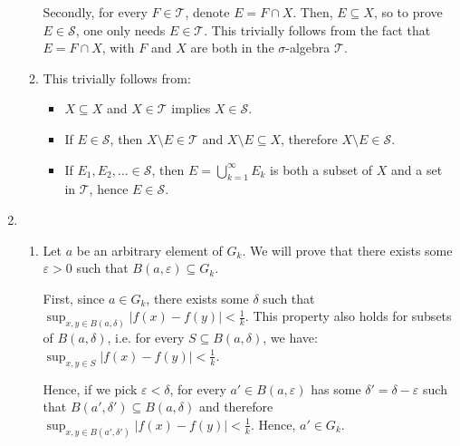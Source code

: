 \begin{enumerate}[label=\textbf{2B.\arabic*}]
\begin{enumerate}[label=(\alph*)]
      Secondly, for every \( F \in \mathcal{T} \), denote \( E = F \cap X \).
      Then, \( E \subseteq X \), so to prove \( E \in \mathcal{S} \), one only
      needs \( E \in \mathcal{T} \). This trivially follows from the fact that
      \( E = F \cap X \), with \( F \) and \( X \) are both in the \( \sigma
      \)-algebra \( \mathcal{T} \).
    \item This trivially follows from:
      \begin{itemize}
        \item \( X \subseteq X \) and \( X \in \mathcal{T} \) implies \( X \in
          \mathcal{S} \).
        \item If \( E \in \mathcal{S} \), then \( X \setminus E \in \mathcal{T}
          \) and \( X \setminus E \subseteq X \), therefore \( X \setminus E \in
          \mathcal{S}\).
        \item If \( E_{1}, E_{2}, \ldots  \in \mathcal{S} \), then \( E =
          \bigcup_{k = 1}^{\infty} E_{k} \) is both a subset of \( X \) and a
          set in \( \mathcal{T} \), hence \( E \in \mathcal{S} \).
    \end{itemize}
  \end{enumerate}
\item 
  \begin{enumerate}[label=(\alph*)]
    \item Let \( a \) be an arbitrary element of \( G_{k} \). We will prove that
      there exists some \( \varepsilon > 0 \) such that \( B(a, \varepsilon)
      \subseteq G_{k} \).

      First, since \( a \in G_{k} \), there exists some \( \delta \) such that
      \( \sup_{x, y \in B(a, \delta)} |f(x)-f(y)| < \frac{1}{k} \). This
      property also holds for subsets of \( B(a, \delta) \), i.e. for every \( S
      \subseteq B(a, \delta)\), we have: \( \sup_{x, y \in S} |f(x)-f(y)| <
      \frac{1}{k} \).

      Hence, if we pick \( \varepsilon < \delta \), for every \( a' \in B(a,
      \varepsilon) \) has some \( \delta' = \delta - \varepsilon \) such that \(
      B(a', \delta') \subseteq B(a, \delta)\) and therefore \( \sup_{x, y \in
      B(a', \delta')} |f(x)-f(y)| < \frac{1}{k} \). Hence, \( a' \in G_{k} \).


\end{enumerate}
\end{enumerate}
